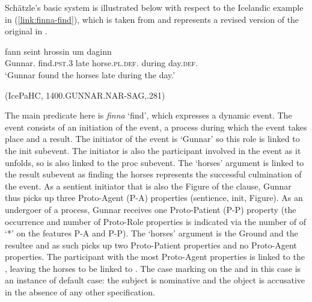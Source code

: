 \documentclass[output=paper,hidelinks]{langscibook}
\begin{document}
Sch\"{a}tzle's basic system is illustrated below with respect to the Icelandic
example in (\ref{link:finna-find}), which is taken from \citet{beck-butt2021} and
represents a revised version of the original in \citet{schaetzle18}.



\ea \label{link:finna-find}
 {fann} {seint} {hrossin} {um} {daginn}\\
{Gunnar.{\NOM}} {find.{\textsc{pst}.3\SG}} {late}
{horse.\textsc{pl.def.}{\ACC}} {during} {day.\textsc{def}.{\ACC}}\\
\glt `Gunnar found the horses late during the day.'\\ \strut \hfill (IcePaHC, 1400.GUNNAR.NAR-SAG,.281)
\z

\hspace{1.5cm}
\vspace{1ex}

The main predicate here is \textit{finna} `find', which expresses a dynamic
event. The event consists of an initiation of the event, a process during which
the event takes place and a result.  The initiator of the event is `Gunnar' so
this role is linked to the init subevent.  The initiator is also the participant
involved in the event as it unfolds, so is also linked to the proc subevent.
The `horses' argument is linked to the result subevent as finding the horses
represents the successful culmination of the event.  As a sentient initiator
that is also the Figure of the clause, Gunnar thus picks up three Proto-Agent
(P-A) properties (sentience, init, Figure).  As an undergoer of a process,
Gunnar receives one Proto-Patient (P-P) property (the occurrence and number of
Proto-Role properties is indicated via the number of of `*' on the features P-A
and P-P).  The `horses' argument is the Ground and the resultee and as such picks up two
Proto-Patient properties and no Proto-Agent properties.  The participant with
the most Proto-Agent properties is linked to the \SUBJ, leaving the horses to be
linked to \OBJ.  The case marking on the \SUBJ and \OBJ in this case is an
instance of default case: the subject is nominative and the object is accusative
in the absence of any other specification.
\end{document}
